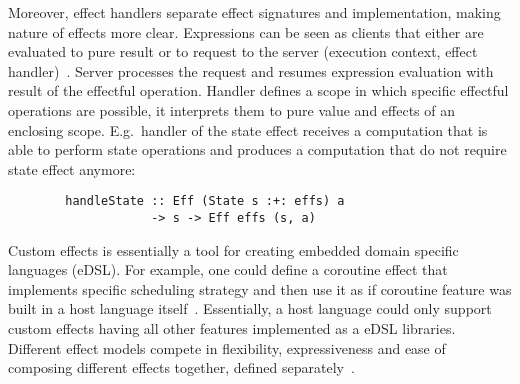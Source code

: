 \documentclass[conference]{IEEEtran}
\begin{document}
%

    Moreover, effect handlers separate effect signatures and implementation, making nature of effects more clear.
    Expressions can be seen as clients that either are evaluated to pure result or to request to the server (execution context, effect handler)~\cite{kiselyov2013extensible}.
    Server processes the request and resumes expression evaluation with result of the effectful operation.
    Handler defines a scope in which specific effectful operations are possible, it interprets them to pure value and effects of an enclosing scope.
    E.g.\ handler of the state effect receives a computation that is able to perform state operations and produces a computation that do not require state effect anymore:
    \begin{verbatim}
        handleState :: Eff (State s :+: effs) a
                    -> s -> Eff effs (s, a)
    \end{verbatim}

    Custom effects is essentially a tool for creating embedded domain specific languages (eDSL).
    For example, one could define a coroutine effect that implements specific scheduling strategy and then use it as if coroutine feature was built in a host language itself~\cite{leijen2017structured}.
    Essentially, a host language could only support custom effects having all other features implemented as a eDSL libraries.
    Different effect models compete in flexibility, expressiveness and ease of composing different effects together, defined separately~\cite{liang1995monad, kiselyov2013extensible, van2024framework}.
\end{document}
